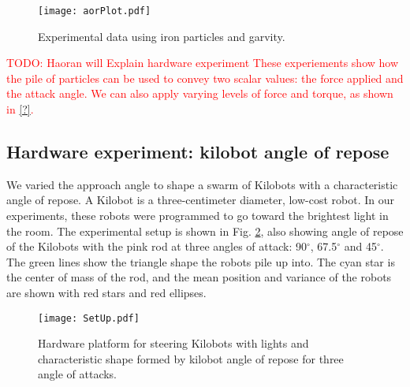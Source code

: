 \begin{figure}
\begin{center}
	\texttt{[image: aorPlot.pdf]}
\end{center}
\caption{\label{fig:angleOfReposeExp}
Experimental data using iron particles and garvity.
}
\end{figure}


\textcolor{red}{TODO: Haoran will Explain hardware experiment
These experiements show how the pile of particles can be used to convey two scalar values: the force applied and the attack angle.  We can also apply varying levels of force and torque, as shown in  \eqref{?}. }

\subsection{Hardware experiment: kilobot angle of repose}
We varied the approach angle to shape a swarm of Kilobots \cite{rubenstein2014programmable} with a characteristic angle of repose. 
 A Kilobot is a three-centimeter diameter,  low-cost robot. In our experiments, these robots were programmed to go toward the brightest light in the room. The experimental setup is shown in Fig. \ref{fig:SetUp}, also showing angle of repose of the Kilobots with  the pink rod at three angles of attack: 90$^\circ$, 67.5$^\circ$ and 45$^\circ$. The green lines show the triangle shape the robots pile up into. The cyan star is the center of mass of the rod, and the mean position and variance of the robots are shown with  red stars and red ellipses.
\begin{figure}
\begin{center}
	\texttt{[image: SetUp.pdf]}
\end{center}
\caption{\label{fig:SetUp}
Hardware platform for steering Kilobots with lights and characteristic shape formed by kilobot angle of repose for three angle of attacks.
}
\end{figure}






